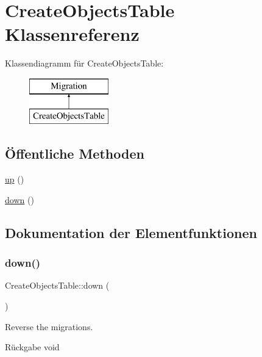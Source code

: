 \hypertarget{classCreateObjectsTable}{}\section{Create\+Objects\+Table Klassenreferenz}
\label{classCreateObjectsTable}
Klassendiagramm für Create\+Objects\+Table\+:\begin{figure}[H]
\begin{center}
\leavevmode
\includegraphics[height=2.000000cm]{d7/dd4/classCreateObjectsTable}
\end{center}
\end{figure}
\subsection*{Öffentliche Methoden}
\begin{DoxyCompactItemize}
\item 
\hyperlink{classCreateObjectsTable_a3eea989485aad745fbfa52fe4f5374ef}{up} ()
\item 
\hyperlink{classCreateObjectsTable_a5433710fd1990fc2551791d94d79d294}{down} ()
\end{DoxyCompactItemize}


\subsection{Dokumentation der Elementfunktionen}
\mbox{\label{classCreateObjectsTable_a5433710fd1990fc2551791d94d79d294}} 
\subsubsection{\texorpdfstring{down()}{down()}}
{\footnotesize\ttfamily Create\+Objects\+Table\+::down (\begin{DoxyParamCaption}{ }\end{DoxyParamCaption})}

Reverse the migrations.

\begin{DoxyReturn}{Rückgabe}
void 
\end{DoxyReturn}
\mbox{\label{classCreateObjectsTable_a3eea989485aad745fbfa52fe4f5374ef}} 
